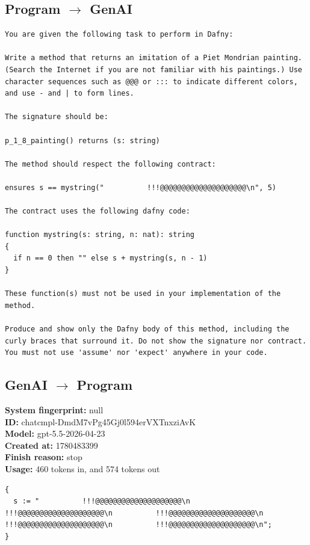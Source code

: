 \documentclass{article}
\begin{document}
\subsection*{Program $\rightarrow$ GenAI}
\begin{lstlisting}
You are given the following task to perform in Dafny:

Write a method that returns an imitation of a Piet Mondrian painting. (Search the Internet if you are not familiar with his paintings.) Use character sequences such as @@@ or ::: to indicate different colors, and use - and | to form lines.

The signature should be:

p_1_8_painting() returns (s: string)

The method should respect the following contract:

ensures s == mystring("          !!!@@@@@@@@@@@@@@@@@@@@\n", 5)

The contract uses the following dafny code:

function mystring(s: string, n: nat): string
{
  if n == 0 then "" else s + mystring(s, n - 1)
}

These function(s) must not be used in your implementation of the method.

Produce and show only the Dafny body of this method, including the curly braces that surround it. Do not show the signature nor contract. You must not use 'assume' nor 'expect' anywhere in your code.
\end{lstlisting}
\subsection*{GenAI $\rightarrow$ Program}
\textbf{System fingerprint: }null
\\\textbf{ID: }chatcmpl-DmdM7vPg45Gj0l594erVXTnxziAvK
\\\textbf{Model: }gpt-5.5-2026-04-23
\\\textbf{Created at: }1780483399
\\\textbf{Finish reason: }stop
\\\textbf{Usage: }460 tokens in, and 574 tokens out
\begin{lstlisting}
{
  s := "          !!!@@@@@@@@@@@@@@@@@@@@\n          !!!@@@@@@@@@@@@@@@@@@@@\n          !!!@@@@@@@@@@@@@@@@@@@@\n          !!!@@@@@@@@@@@@@@@@@@@@\n          !!!@@@@@@@@@@@@@@@@@@@@\n";
}
\end{lstlisting}
\end{document}
